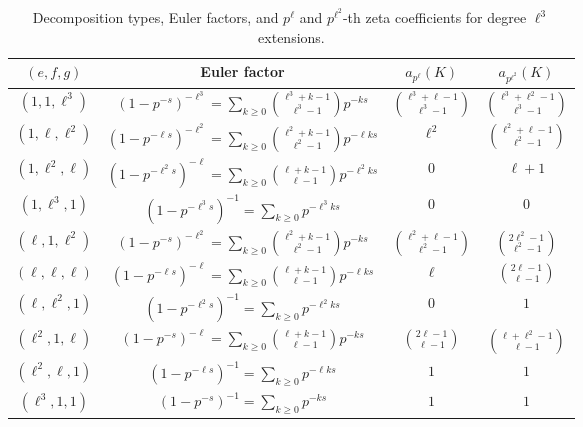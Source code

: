 \documentclass[letterpaper, 10pt]{article}
\newcommand{\1}{\mathds{1}}	%
\theoremstyle{definition}
\theoremstyle{remark}
\begin{document}
\begin{table}[h]
    \begin{center}
        \begin{tabular}{c|c|c|c}
            \toprule
            $(e, f, g)$ & Euler factor & $a_{p^\ell}(K)$ & $a_{p^{\ell^2}}(K)$ \\
            \midrule
            $(1, 1, \ell^3)$ & $(1 - p^{-s})^{-\ell^3} = \sum_{k \ge 0} \binom{\ell^3 + k - 1}{\ell^3 - 1}p^{-ks}$ & $\binom{\ell^3 + \ell - 1}{\ell^3 - 1}$ & $\binom{\ell^3 + \ell^2 - 1}{\ell^3 - 1}$ \\
            $(1, \ell, \ell^2)$ & $(1 - p^{-\ell s})^{-\ell^2} = \sum_{k \ge 0} \binom{\ell^2 + k - 1}{\ell^2 - 1} p^{-\ell k s}$ & $\ell^2$ & $\binom{\ell^2 + \ell - 1}{\ell^2 - 1}$ \\
            $(1, \ell^2, \ell)$ & $(1 - p^{-\ell^2 s})^{-\ell} = \sum_{k \ge 0} \binom{\ell + k - 1}{\ell - 1} p^{-\ell^2 k s}$ & $0$ & $\ell + 1$ \\
            $(1, \ell^3, 1)$ & $(1 - p^{-\ell^3 s})^{-1} = \sum_{k \ge 0}p^{-\ell^3 k s}$ & $0$ & $0$ \\
            $(\ell, 1, \ell^2)$ & $(1 - p^{-s})^{-\ell^2} = \sum_{k \ge 0} \binom{\ell^2 + k - 1}{\ell^2- 1} p^{-ks}$ & $\binom{\ell^2 + \ell - 1}{\ell^2 - 1}$ & $\binom{2\ell^2 - 1}{\ell^2 - 1}$ \\
            $(\ell, \ell, \ell)$ & $(1 - p^{-\ell s})^{-\ell} = \sum_{k \ge 0} \binom{\ell + k - 1}{\ell - 1} p^{-\ell ks}$ & $\ell$ & $\binom{2\ell - 1}{\ell - 1}$ \\
            $(\ell, \ell^2, 1)$ & $(1 - p^{-\ell^2 s})^{-1} = \sum_{k \ge 0} p^{-\ell^2 ks}$ & $0$ & $1$ \\
            $(\ell^2, 1, \ell)$ & $(1 - p^{-s})^{-\ell} = \sum_{k \ge 0} \binom{\ell + k - 1}{\ell - 1} p^{-ks}$ & $\binom{2\ell - 1}{\ell - 1}$ & $\binom{\ell + \ell^2 - 1}{\ell - 1}$\\
            $(\ell^2, \ell, 1)$ & $(1 - p^{-\ell s})^{-1} = \sum_{k \ge 0} p^{-\ell ks}$ & $1$ & $1$ \\
            $(\ell^3, 1, 1)$ & $(1 - p^{-s})^{-1} = \sum_{k \ge 0} p^{-ks}$ & $1$ & $1$ \\
            \bottomrule
        \end{tabular}
        \caption{Decomposition types, Euler factors, and $p^{\ell}$ and $p^{\ell^2}$-th zeta coefficients for degree $\ell^3$ extensions.}
        \label{tab:lcbeuler}
    \end{center}
\end{table}
\end{document}
